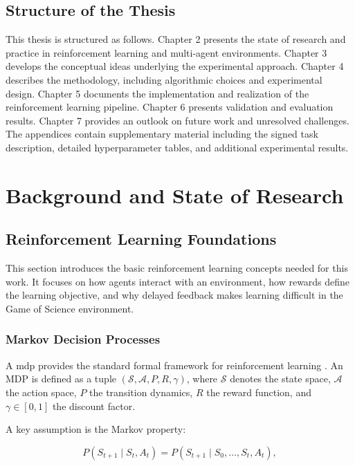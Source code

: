 \documentclass[english,bachelor]{hsluthesis}
\begin{document}
\section{Structure of the Thesis}
This thesis is structured as follows. Chapter 2 presents the state of research and practice in reinforcement learning and multi-agent environments. Chapter 3 develops the conceptual ideas underlying the experimental approach. Chapter 4 describes the methodology, including algorithmic choices and experimental design. Chapter 5 documents the implementation and realization of the reinforcement learning pipeline. Chapter 6 presents validation and evaluation results. Chapter 7 provides an outlook on future work and unresolved challenges. The appendices contain supplementary material including the signed task description, detailed hyperparameter tables, and additional experimental results.

\chapter{Background and State of Research}

\section{Reinforcement Learning Foundations}
This section introduces the basic reinforcement learning concepts needed for this work. It focuses on how agents interact with an environment, how rewards define the learning objective, and why delayed feedback makes learning difficult in the Game of Science environment.

\subsection{Markov Decision Processes}
A \gls{mdp} provides the standard formal framework for reinforcement learning \cite{sutton2018reinforcement}. An MDP is defined as a tuple $(\mathcal{S}, \mathcal{A}, P, R, \gamma)$, where $\mathcal{S}$ denotes the state space, $\mathcal{A}$ the action space, $P$ the transition dynamics, $R$ the reward function, and $\gamma \in [0,1]$ the discount factor.

A key assumption is the Markov property:

\begin{equation}
P(S_{t+1} \mid S_t, A_t) = P(S_{t+1} \mid S_0, \dots, S_t, A_t),
\end{equation}
\end{document}
